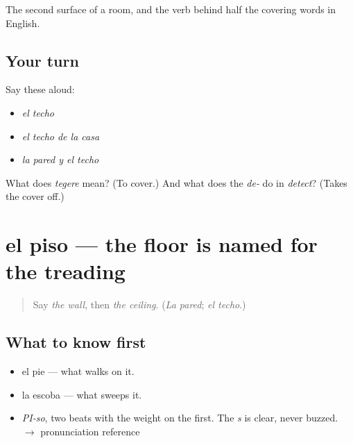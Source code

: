\begin{grammarlens}[title={What you've built}]
The second surface of a room, and the verb behind half the covering words in English.
\end{grammarlens}

\subsection*{Your turn}
Say these aloud:

\begin{itemize}
\raggedright
  \item \emph{el techo}
  \item \emph{el techo de la casa}
  \item \emph{la pared y el techo}
\end{itemize}

\begin{tcolorbox}[breakable,colback=teal!4,colframe=teal!35!black,title={Before you move on}]
What does \emph{tegere} mean? (To cover.) And what does the \emph{de-} do in \emph{detect}? (Takes the cover off.)
\end{tcolorbox}
\section[el piso]{el piso — the floor is named for the treading}

\label{lesson:ES-C355-piso}



\begin{quote}
Say \emph{the wall}, then \emph{the ceiling}. (\emph{La pared}; \emph{el techo}.)
\end{quote}

\subsection*{What to know first}
\begin{itemize}
\raggedright
  \item el pie — what walks on it.
  \item la escoba — what sweeps it.
\end{itemize}

\begin{sounds}
\begin{itemize}
\raggedright
  \item \emph{PI-so}, two beats with the weight on the first. The \emph{s} is clear, never buzzed. $\to$ pronunciation reference
\end{itemize}
\end{sounds}

